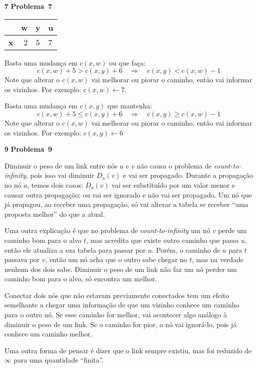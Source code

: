 \documentclass{article}
\newcounter{exe-list}
\newenvironment{exe-list}
    {\begin{list}{\alph{exe-list}.}{\usecounter{exe-list}}}
    {\end{list}}
\newenvironment{exe}[2][Problema]
    {\newcommand{\opt}{(Opcional)}%
    \newcommand{\sketch}[1]{{\bfseries Rascunho:} ##1}%
    \medskip\par\noindent\ifthenelse{\equal{#1}{}}
        {\textbf{\large #2}}
        {\textbf{\large #1~#2}}%
    \medskip\par\noindent}
    {\medskip}
\begin{document}
\begin{exe}{7}
    \begin{exe-list}
    \item \hspace{1ex}\par
        \begin{center}\begin{tabular}{|c|rcl|}\hline
            & \textbf{w} & \textbf{y} & \textbf{u} \\\hline
            \textbf{x} & 2 & 5 & 7 \\\hline
        \end{tabular}\end{center}
    \item Basta uma mudança em \(c(x, w)\) ou que faça:
        \[
            c(x, w) + 5 > c(x, y) + 6
            \quad\Longrightarrow\quad
            c(x, y) < c(x, w) - 1
        \]
        Note que alterar o \(c(x, w)\) vai melhorar ou piorar
        o caminho, então vai informar os vizinhos.
        Por exemplo: \(c(x, w) \leftarrow 7\).
    \item Basta uma mudança em \(c(x, y)\) que mantenha:
        \[
            c(x, w) + 5 \le c(x, y) + 6
            \quad\Longrightarrow\quad
            c(x, y) \ge c(x, w) - 1
        \]
        Note que alterar o \(c(x, w)\) vai melhorar ou piorar
        o caminho, então vai informar os vizinhos.
        Por exemplo: \(c(x, y) \leftarrow 6\)
    \end{exe-list}
\end{exe}

\begin{exe}{9}
    Diminuir o peso de um link entre nós \(u\) e \(v\)
    não causa o problema de \emph{count-to-infinity},
    pois isso vai diminuir \(D_u(v)\) e vai ser propagado.
    Durante a propagação no nó \(a\), temos dois casos:
    \(D_a(v)\) vai ser substituído por um valor menor
    e causar outra propagação;
    ou vai ser ignorado e não vai ser propagado.
    Um nó que já propagou, ao receber uma propagação,
    só vai alterar a tabela se receber ``uma proposta melhor''
    do que a atual.

    Uma outra explicação é que no problema de \emph{count-to-infinity}
    um nó \(v\) perde um caminho bom para o alvo \(t\),
    mas acredita que existe outro caminho que passa \(u\),
    então ele atualiza a sua tabela para passar por \(u\).
    Porém, o caminho de \(u\) para \(t\) passava por \(v\),
    então um nó acha que o outro sabe chegar no \(t\),
    mas na verdade nenhum dos dois sabe.
    Diminuir o peso de um link não faz um nó perder um caminho bom
    para o alvo, só encontra um melhor.

    Conectar dois nós que não estavam previamente conectados
    tem um efeito semelhante a chegar uma informação de que
    um vizinho conhece um caminho para o outro nó.
    Se esse caminho for melhor,
    vai acontecer algo análogo à diminuir o peso de um link.
    Se o caminho for pior,
    o nó vai ignorá-lo, pois já conhece um caminho melhor.

    Uma outra forma de pensar é dizer que o link sempre existiu,
    mas foi reduzido de \(\infty\) para uma quantidade ``finita''.
\end{exe}
\end{document}
